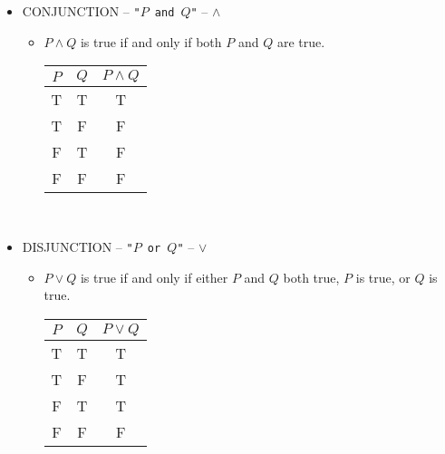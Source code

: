         \begin{itemize}
            \item CONJUNCTION -- \texttt{"\(P\) and \(Q\)"} -- \(\wedge\)
                \begin{itemize}
                    \item \(P\wedge Q\) is true if and only if both \(P\) and \(Q\) are true.
                    \\
                    \begin{center}
                    \begin{tabular}{c|c|c}
                        \hline
                        \(P\) & \(Q\) & \(P\wedge Q\) \\
                        \hline
                        T & T & T \\
                        T & F & F \\
                        F & T & F \\
                        F & F & F \\
                        \hline
                    \end{tabular}
                    \end{center}
                    \vphantom
                    \\
                \end{itemize}
            \item DISJUNCTION -- \texttt{"\(P\) or \(Q\)"} -- \(\vee\)
                \begin{itemize}
                    \item \(P\vee Q\) is true if and only if either \(P\) and \(Q\) both true, \(P\) is true, or \(Q\) is true.
                    \\
                    \begin{center}
                    \begin{tabular}{c|c|c}
                        \hline
                        \(P\) & \(Q\) & \(P\vee Q\) \\
                        \hline
                        T & T & T \\
                        T & F & T \\
                        F & T & T \\
                        F & F & F \\
                        \hline
                    \end{tabular}
                    \end{center}

\end{itemize}
\end{itemize}
